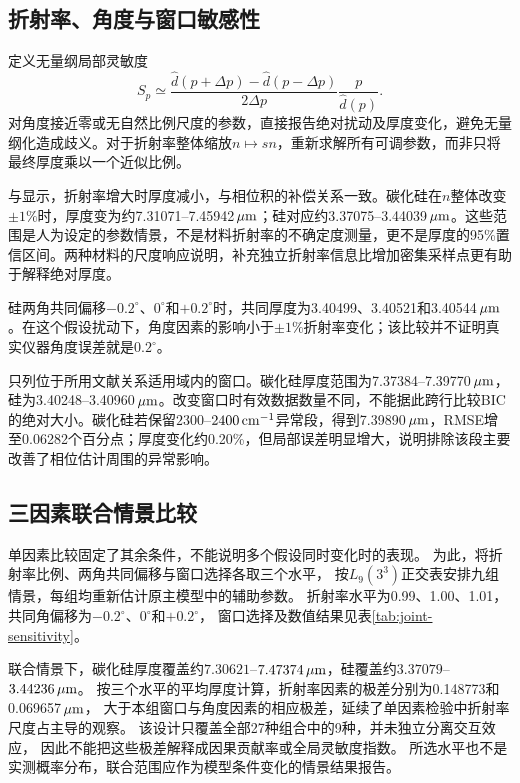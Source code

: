 \subsection{折射率、角度与窗口敏感性}
定义无量纲局部灵敏度
\begin{equation}
 S_p\simeq\frac{\widehat d(p+\Delta p)-\widehat d(p-\Delta p)}{2\Delta p}
             \frac{p}{\widehat d(p)}.
 \label{eq:normalized-sensitivity}
\end{equation}
对角度接近零或无自然比例尺度的参数，直接报告绝对扰动及厚度变化，避免无量纲化造成歧义。对于折射率整体缩放$n\mapsto sn$，重新求解所有可调参数，而非只将最终厚度乘以一个近似比例。


与显示，折射率增大时厚度减小，与相位积的补偿关系一致。碳化硅在$n$整体改变$\pm1\%$时，厚度变为约7.31071--7.45942$\,\mu\mathrm{m}$；硅对应约3.37075--3.44039$\,\mu\mathrm{m}$。这些范围是人为设定的参数情景，不是材料折射率的不确定度测量，更不是厚度的95\%置信区间。两种材料的尺度响应说明，补充独立折射率信息比增加密集采样点更有助于解释绝对厚度。

硅两角共同偏移$-0.2^\circ$、$0^\circ$和$+0.2^\circ$时，共同厚度为3.40499、3.40521和3.40544$\,\mu\mathrm{m}$。在这个假设扰动下，角度因素的影响小于$\pm1\%$折射率变化；该比较并不证明真实仪器角度误差就是$0.2^\circ$。


只列位于所用文献关系适用域内的窗口。碳化硅厚度范围为7.37384--7.39770$\,\mu\mathrm{m}$，硅为3.40248--3.40960$\,\mu\mathrm{m}$。改变窗口时有效数据数量不同，不能据此跨行比较BIC的绝对大小。碳化硅若保留$2300$--$2400\,\mathrm{cm}^{-1}$异常段，得到7.39890$\,\mu\mathrm{m}$，RMSE增至0.06282个百分点；厚度变化约0.20\%，但局部误差明显增大，说明排除该段主要改善了相位估计周围的异常影响。

\subsection{三因素联合情景比较}
单因素比较固定了其余条件，不能说明多个假设同时变化时的表现。
为此，将折射率比例、两角共同偏移与窗口选择各取三个水平，
按$L_9(3^3)$正交表安排九组情景，每组均重新估计原主模型中的辅助参数。
折射率水平为0.99、1.00、1.01，共同角偏移为$-0.2^\circ$、$0^\circ$和$+0.2^\circ$，
窗口选择及数值结果见表\ref{tab:joint-sensitivity}。


联合情景下，碳化硅厚度覆盖约$7.30621$--$7.47374\,\mu\mathrm{m}$，硅覆盖约$3.37079$--$3.44236\,\mu\mathrm{m}$。
按三个水平的平均厚度计算，折射率因素的极差分别为0.148773和0.069657$\,\mu\mathrm{m}$，
大于本组窗口与角度因素的相应极差，延续了单因素检验中折射率尺度占主导的观察。
该设计只覆盖全部27种组合中的9种，并未独立分离交互效应，
因此不能把这些极差解释成因果贡献率或全局灵敏度指数。
所选水平也不是实测概率分布，联合范围应作为模型条件变化的情景结果报告。


